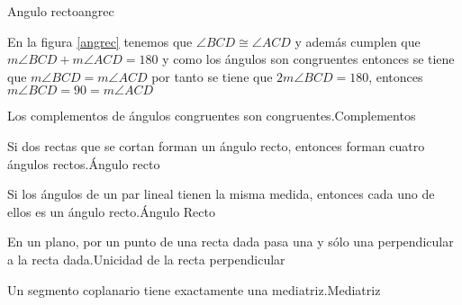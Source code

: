\begin{figura}{
}{Angulo recto}{angrec}
\begin{probar}{En la figura \ref{angrec} tenemos que $\angle BCD \cong \angle ACD $ y adem\'as cumplen
que $m\angle BCD + m\angle ACD =180 $ y como los \'angulos son congruentes entonces se tiene
que $m\angle BCD = m\angle ACD $ por tanto se tiene que $2m\angle BCD =180 $, entonces 
$m\angle BCD =90=m\angle ACD$}
\end{probar}

\end{figura}
\begin{teorema}{Los complementos de \'angulos congruentes son
congruentes.}{Complementos}
\end{teorema}

\begin{teorema}{Si dos rectas que se cortan forman un \'angulo recto, entonces
forman cuatro \'angulos rectos.}{\'Angulo recto}
\end{teorema}
\begin{teorema}{Si los \'angulos de un par lineal tienen la misma
medida, entonces cada uno de ellos es un \'angulo recto.}{\'Angulo Recto}
\end{teorema}
\begin{teorema}{En un plano, por un punto de una recta dada pasa una y s\'olo
una perpendicular a la recta dada.}{Unicidad de la recta perpendicular}
\end{teorema}
\begin{teorema}{
Un segmento coplanario tiene exactamente una mediatriz.}{Mediatriz}
\end{teorema}
